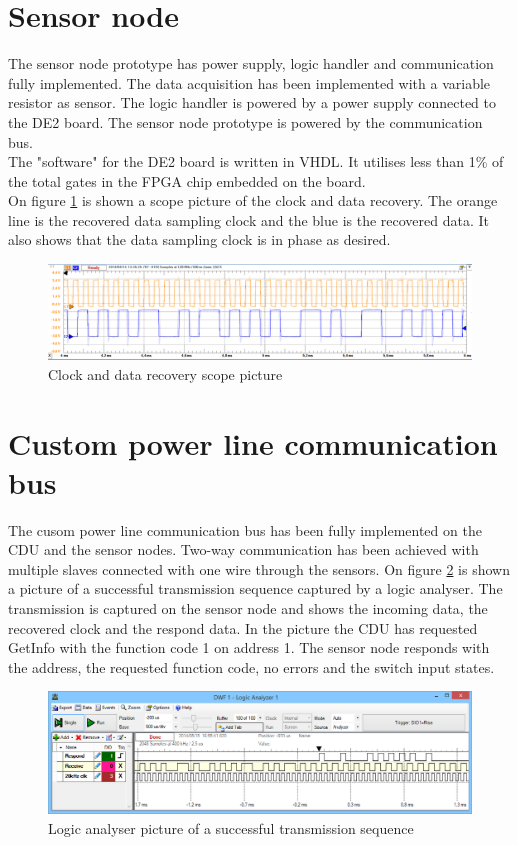 \section{Sensor node}
The sensor node prototype has power supply, logic handler and communication fully implemented. The data acquisition has been implemented with a variable resistor as sensor. The logic handler is powered by a power supply connected to the DE2 board. The sensor node prototype is powered by the communication bus.\\
The "software" for the DE2 board is written in VHDL. It utilises less than 1\% of the total gates in the FPGA chip embedded on the board.\\
On figure \ref{pic:cdr} is shown a scope picture of the clock and data recovery. The orange line is the recovered data sampling clock and the blue is the recovered data. It also shows that the data sampling clock is in phase as desired.
\begin{figure}[H]
	\centering
	\includegraphics[width=1\textwidth]{billeder/12projectresults/cdr}
	\caption{Clock and data recovery scope picture}
	\label{pic:cdr}
\end{figure}

\section{Custom power line communication bus}
The cusom power line communication bus has been fully implemented on the CDU and the sensor nodes. Two-way communication has been achieved with multiple slaves connected with one wire through the sensors. On figure \ref{pic:trans} is shown a picture of a successful transmission sequence captured by a logic analyser. The transmission is captured on the sensor node and shows the incoming data, the recovered clock and the respond data. In the picture the CDU has requested GetInfo with the function code 1 on address 1. The sensor node responds with the address, the requested function code, no errors and the switch input states.
\begin{figure}[H]
	\centering
	\includegraphics[width=1\textwidth]{billeder/12projectresults/transmission}
	\caption{Logic analyser picture of a successful transmission sequence}
	\label{pic:trans}
\end{figure}

